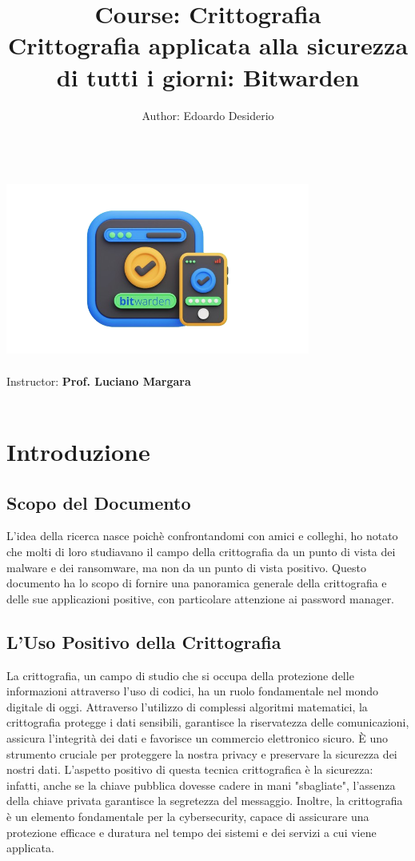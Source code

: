 \documentclass[a4paper,12pt]{report}
\title{\Large Course: Crittografia    \\[0.5cm]
        \bf\Large Crittografia applicata alla sicurezza di tutti i giorni: Bitwarden}
\author{\large Author: Edoardo Desiderio\\ \ \\}
\date{}
\begin{document}
	\makeatletter
		\begin{titlepage}
			\begin{center}
		{ \includegraphics[width=10cm]{bitwarden-removebg-preview.png}}
		{\ \\}
			\vbox{}\vspace{2cm}
				{\@title }\\[3cm] 
				{\@author}
				{\large Instructor: \bf Prof. Luciano Margara\\ \ \\}
			\end{center}
		\end{titlepage}
	\makeatother
	\mbox{\thispagestyle{empty}}
	\titlepage
	\tableofcontents{\thispagestyle{empty}}
	\setcounter{page}{0}

	\chapter{Introduzione}
	\section{Scopo del Documento}
	L'idea della ricerca nasce poichè confrontandomi con amici e colleghi, ho notato
	che molti di loro studiavano il campo della crittografia da un punto di vista
	dei malware e dei ransomware, ma non da un punto di vista positivo. Questo
	documento ha lo scopo di fornire una panoramica generale della crittografia e
	delle sue applicazioni positive, con particolare attenzione ai password manager.
	\section{L'Uso Positivo della Crittografia} 
	La crittografia, un campo di studio che si
	occupa della protezione delle informazioni attraverso l'uso di codici, ha un
	ruolo fondamentale nel mondo digitale di oggi. Attraverso l'utilizzo di
	complessi algoritmi matematici, la crittografia protegge i dati sensibili,
	garantisce la riservatezza delle comunicazioni, assicura l'integrità dei dati e
	favorisce un commercio elettronico sicuro. È uno strumento cruciale per
	proteggere la nostra privacy e preservare la sicurezza dei nostri dati.
	L'aspetto positivo di questa tecnica crittografica è la sicurezza: infatti,
	anche se la chiave pubblica dovesse cadere in mani "sbagliate", l'assenza della
	chiave privata garantisce la segretezza del messaggio. Inoltre, la crittografia
	è un elemento fondamentale per la cybersecurity, capace di assicurare una
	protezione efficace e duratura nel tempo dei sistemi e dei servizi a cui viene
	applicata. 
\end{document}
